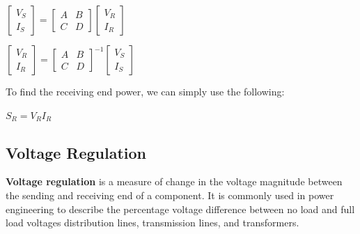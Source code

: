 \documentclass[a4paper,12pt]{article}
\begin{document}
    \begin{center}
      \begin{math}
        \begin{bmatrix}
          V_S \\ I_S
        \end{bmatrix}
        =
        \begin{bmatrix}
          A & B \\
          C & D 
        \end{bmatrix}
        \begin{bmatrix}
          V_R \\ I_R
        \end{bmatrix}
      \end{math}

      \vspace{12pt}      
      \begin{math}
        \begin{bmatrix}
          V_R \\ I_R
        \end{bmatrix}
        =
        \begin{bmatrix}
          A & B \\
          C & D 
        \end{bmatrix}^{-1}
        \begin{bmatrix}
          V_S \\ I_S
        \end{bmatrix}
      \end{math}
    \end{center}

  To find the receiving end power, we can simply use the following:

    \begin{center}
      \begin{math}
        S_R = V_R I_R
      \end{math}
    \end{center}

    \subsection*{Voltage Regulation}
    {\bf Voltage regulation} is a measure of change in the voltage magnitude 
    between the sending and receiving end of a component. 
    It is commonly used in power engineering to describe the percentage 
    voltage difference between no load and full load voltages distribution 
    lines, transmission lines, and transformers.
\end{document}
